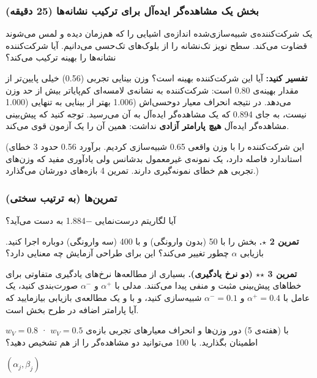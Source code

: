 \subsubsection{\texorpdfstring{بخش  یک مشاهده‌گر ایده‌آل برای ترکیب
نشانه‌ها (25
دقیقه)}{بخش E: یک مشاهده‌گر ایده‌آل برای ترکیب نشانه‌ها (25 دقیقه)}}

یک شرکت‌کننده‌ی شبیه‌سازی‌شده اندازه‌ی اشیایی را که هم‌زمان دیده و لمس می‌شوند
قضاوت می‌کند. سطح نویز تک‌نشانه را از بلوک‌های تک‌حسی می‌دانیم. آیا شرکت‌کننده
نشانه‌ها را بهینه ترکیب می‌کند؟

\textbf{تفسیر کنید:} آیا این شرکت‌کننده بهینه است؟ وزن بینایی تجربی
(0.56) خیلی پایین‌تر از مقدار بهینه‌ی 0.80 است: شرکت‌کننده به نشانه‌ی
لامسه‌ای کم‌پایاتر بیش از حد وزن می‌دهد. در نتیجه انحراف معیار دوحسی‌اش
(1.006  بهتر از بینایی به تنهایی (1.000  نیست، به جای
0.894  که یک مشاهده‌گر ایده‌آل به آن می‌رسید. توجه کنید که پیش‌بینی
مشاهده‌گر ایده‌آل \textbf{هیچ پارامتر آزادی} نداشت: همین آن را یک آزمون
قوی می‌کند.

(این شرکت‌کننده را با وزن واقعی 0.65 شبیه‌سازی کردیم. برآورد 0.56 حدود 3
خطای استاندارد فاصله دارد، یک نمونه‌ی غیرمعمول بدشانس ولی یادآوری مفید که
وزن‌های تجربی هم خطای نمونه‌گیری دارند. تمرین 4 بازه‌های 
دورشان می‌گذارد.)

\subsubsection{تمرین‌ها (به ترتیب سختی)}

آیا لگاریتم درست‌نمایی \ensuremath{-}1.884 به دست می‌آید؟

\textbf{تمرین 2 \ensuremath{\star}.} بخش  را با 50  (بدون وارونگی) و با
400  (سه وارونگی) دوباره اجرا کنید. بازیابی \(\alpha\) چطور
تغییر می‌کند؟ این برای طراحی آزمایش چه معنایی دارد؟

\textbf{تمرین 3 \ensuremath{\star}\ensuremath{\star} (دو نرخ یادگیری).} بسیاری از مطالعه‌ها نرخ‌های یادگیری
متفاوتی برای خطاهای پیش‌بینی مثبت و منفی پیدا می‌کنند. مدلی با
\(\alpha^{+}\) و \(\alpha^{-}\) صورت‌بندی کنید، یک عامل با
\(\alpha^{+} = 0.4\) و \(\alpha^{-} = 0.1\) شبیه‌سازی کنید، و با
 و یک مطالعه‌ی بازیابی بیازمایید که آیا پارامتر اضافه در طرح
بخش  است.

\(w_V = 0.8\) · \(w_V = 0.5\) با  (هفته‌ی 5) دور وزن‌ها و
انحراف معیارهای تجربی بازه‌ی اطمینان بگذارید. با 100  می‌توانید
دو مشاهده‌گر را از هم تشخیص دهید؟

\((\alpha_j, \beta_j)\)

